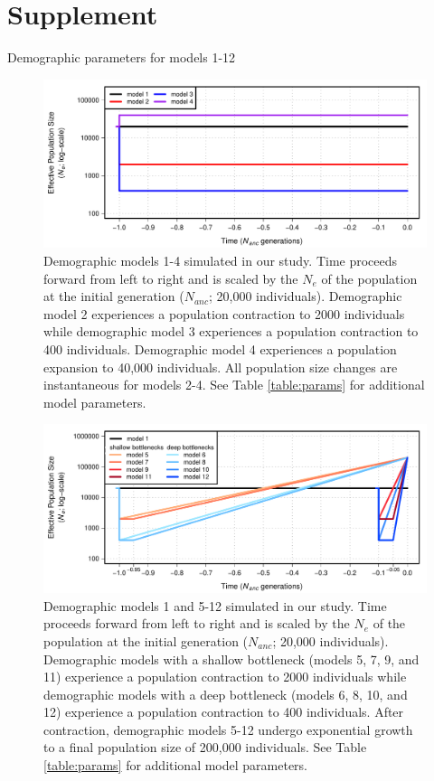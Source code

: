 \documentclass[9pt,twocolumn,twoside]{rilabRxiv}
\newcommand{\beginsupplement}{%
        \setcounter{table}{0}
        \renewcommand{\thetable}{S\arabic{table}}%
        \setcounter{figure}{0}
        \renewcommand{\thefigure}{S\arabic{figure}}%
     }
\begin{document}


\onecolumn

\beginsupplement
\section*{Supplement}

\begin{table}

\caption{Demographic parameters for models 1-12}
\label{table:params}
\end{table}
\pagebreak

\begin{figure}[h!]
\includegraphics[width=0.8\linewidth]{figures/FigS1.pdf}
\caption{Demographic models 1-4 simulated in our study.
Time proceeds forward from left to right and is scaled by the $N_e$ of the population at the initial generation ($N_{anc}$; 20,000 individuals).
Demographic model 2 experiences a population contraction to 2000 individuals while demographic model 3 experiences a population contraction to 400 individuals.
Demographic model 4 experiences a population expansion to 40,000 individuals.
All population size changes are instantaneous for models 2-4.
See Table \ref{table:params} for additional model parameters.}
\label{fig:models1}
\end{figure}
\pagebreak

\begin{figure}[t]
\includegraphics[width=0.8\linewidth]{figures/FigS2.pdf}
\caption{Demographic models 1 and 5-12 simulated in our study.
Time proceeds forward from left to right and is scaled by the $N_e$ of the population at the initial generation ($N_{anc}$; 20,000 individuals).
Demographic models with a shallow bottleneck (models 5, 7, 9, and 11) experience a population contraction to 2000 individuals while demographic models with a deep bottleneck (models 6, 8, 10, and 12) experience a population contraction to 400 individuals.
After contraction, demographic models 5-12 undergo exponential growth to a final population size of 200,000 individuals.
See Table \ref{table:params} for additional model parameters.}
\label{fig:models2}
\end{figure}
\pagebreak
\end{document}
